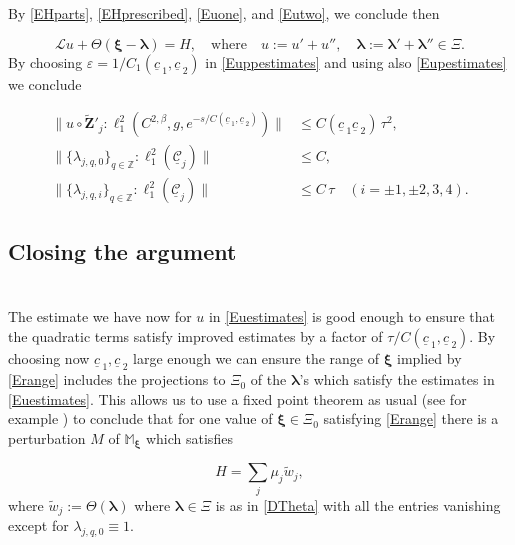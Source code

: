 \documentclass[12pt,namelimits,sumlimits]{amsart}
\theoremstyle{remark}
\numberwithin{equation}{section}
\begin{document}
By \ref{EHparts}, \ref{EHprescribed}, \ref{Euone}, and \ref{Eutwo},
we conclude then
\addtocounter{theorem}{1}
\begin{equation}
\label{Eu}
{\ensuremath{\mathcal L}} u + \Theta({{\boldsymbol{\xi}}}-{\boldsymbol{\lambda}})=H,
\quad\text{where} \quad
u:=u'+u'',
\quad
{\boldsymbol{\lambda}}:={\boldsymbol{\lambda}}'+{\boldsymbol{\lambda}}''\in\Xi.
\end{equation}
By choosing $\varepsilon=1/C_1({\underline{c}\,}_1,{\underline{c}\,}_2)$ in \ref{Euppestimates}
and using also \ref{Eupestimates} we conclude
\addtocounter{theorem}{1}
\begin{equation}
\label{Euestimates}
\begin{aligned}
\|u
\circ {\widetilde{\boldsymbol{Z}}}'_j
:
\ell^2_1(C^{2,\beta},g,e^{-s/C({\underline{c}\,}_1,{\underline{c}\,}_2)})
\|
&\le
C({\underline{c}\,}_1{\underline{c}\,}_2)\,\tau^2,
\\
\|\{\lambda_{{{j,q}},0}\}_{q\in{\mathbb{Z}}}:\ell^2_1({\underline{{\mathcal{C}}}}_j)\|
&\le C,
\\
\|\{\lambda_{{{j,q}},i}\}_{q\in{\mathbb{Z}}}:\ell^2_1({\underline{{\mathcal{C}}}}_j)\|
&\le C\,\tau
\quad
({{i=\pm1,\pm2}},3,4).
\end{aligned}
\end{equation}

\subsection*{Closing the argument}
$\phantom{ab}$
\nopagebreak

The estimate we have now for $u$ in \ref{Euestimates} is good enough to ensure
that the quadratic terms satisfy improved estimates by a factor of $\tau/C({\underline{c}\,}_1,{\underline{c}\,}_2)$.
By choosing now ${\underline{c}\,}_1,{\underline{c}\,}_2$ large enough we can ensure the range of ${{\boldsymbol{\xi}}}$ implied by \ref{Erange}
includes the projections to $\Xi_0$
of the ${\boldsymbol{\lambda}}$'s which satisfy the estimates in
\ref{Euestimates}.
This allows us to use a fixed point theorem as usual (see for example \cite{kapouleas:finite})
to conclude that for one value of ${{\boldsymbol{\xi}}}\in\Xi_0$ satisfying \ref{Erange}
there is a perturbation $M$ of ${\mathbb{M}}_{{\boldsymbol{\xi}}}$
which satisfies
\addtocounter{theorem}{1}
\begin{equation}
\label{EHfinal}
H=\sum_j \mu_j \widetilde{w}_j,
\end{equation}
where $\widetilde{w}_j:=\Theta({\boldsymbol{\lambda}})$
where ${\boldsymbol{\lambda}}\in\Xi$ is as in \ref{DTheta} with all the entries vanishing except for $\lambda_{{{j,q}},0}\equiv1$.
\end{document}
